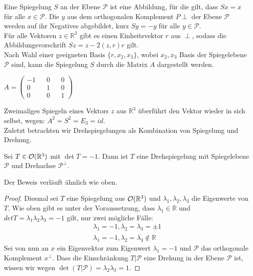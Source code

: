 \begin{bem}
Eine Spiegelung $S$ an der Ebene $\mathcal{P}$ ist eine Abbildung, für die gilt, dass $Sx=x$ für alle $x \in \mathcal{P}$. Die $y$ aus dem orthogonalen Komplement $P{\perp}$ der Ebene $\mathcal{P}$ werden auf ihr Negatives abgebildet, kurz $Sy=-y$ für alle $y\in \mathcal{P}$.\\
Für alle Vektoren $z \in \mathbb{R}^3$ gibt es einen Einheitsvektor $r$ aus ${\perp}$, sodass die Abbildungsvorschrift $Sz = z -2(z,r)r$ gilt.\\
Nach Wahl einer geeigneten Basis $\{r, x_2, x_3\}$, wobei $x_2, x_3$ Basis der Spiegelebene $\mathcal{P}$ sind, kann die Spiegelung $S$ durch die Matrix $A$ dargestellt werden.
\begin{center}
  $A= \begin{pmatrix}
        -1 && 0 && 0 \\
        0 && 1 && 0 \\
        0 && 0 && 1 
       \end{pmatrix}$
 \end{center}
 \end{bem}
 Zweimaliges Spiegeln eines Vektors $z$ aus $\mathbb{R}^3$ überführt den Vektor wieder in sich selbst, wegen: $A^2 = S^2 = E_3 = id$.\\
 Zuletzt betrachten wir Drehspiegelungen als Kombination von Spiegelung und Drehung.
 \begin{theorem}
 Sei $T\in{\mathcal{O}(\mathbb{R}^3)}$ mit $\det T = -1$. Dann ist $T$ eine Drehspiegelung mit Spiegelebene $\mathcal{P}$ und Drehachse $\mathcal{P}^{\perp}$.
 \end{theorem}
 Der Beweis verläuft ähnlich wie oben.
 \begin{proof}
 Diesmal sei $T$ eine Spiegelung aus ${\mathcal{O}(\mathbb{R}^3)}$ und $\lambda_1,\lambda_2, \lambda_3$ die Eigenwerte von $T$. Wie oben gibt es unter der Voraussetzung, dass $\lambda_1 \in \mathbb{R}$  und $det T = \lambda_1\lambda_2\lambda_3=-1$ gilt, nur zwei mögliche Fälle:
 \begin{align}
   \lambda_1=-1, \lambda_2=\lambda_3=\pm1 \\
   \lambda_1=-1, \lambda_2=\overline{\lambda_3}\notin \mathbb{R}
  \end{align}
 Sei von nun an $x$ ein Eigenvektor zum Eigenwert $\lambda_1=-1$ und $\mathcal{P}$ das orthogonale Komplement $x^{\perp}$. Dass die Einschränkung $T|\mathcal{P}$ eine Drehung in der Ebene $\mathcal{P}$ ist, wissen wir wegen $\det(T|\mathcal{P}) = \lambda_2\lambda_3=1.$
 \end{proof}
